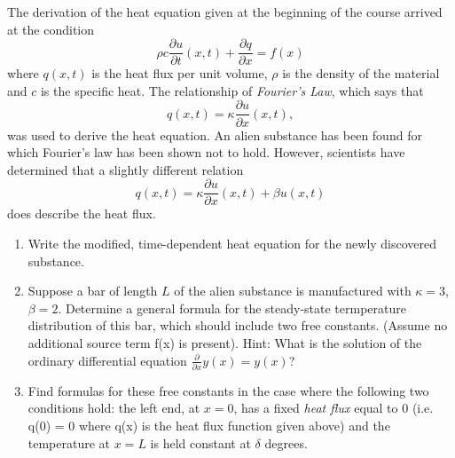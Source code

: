 
The derivation of the heat equation given at the beginning of the course arrived at the condition 
\[
\rho c \frac{\partial u}{\partial t} (x,t) + \frac{\partial q}{\partial x} = f(x)
\]
where $q(x,t)$ is the heat flux per unit volume, $\rho$ is the density of the material and $c$ is the specific heat.  The relationship of \textit{Fourier's Law}, which says that 
\[
q(x,t) = \kappa \frac{\partial u}{\partial x}(x,t),
\]
was used to derive the heat equation.  An alien substance has been found for which Fourier's law has been shown not to hold.  However, scientists have determined that a slightly different relation
\[
q(x,t) = \kappa\frac{\partial u}{\partial x}(x,t) + \beta u(x,t)
\]
does describe the heat flux.

\begin{enumerate}
\item Write the modified, time-dependent heat equation for the newly discovered substance.  

\item Suppose a bar of length $L$ of the alien substance is manufactured with $\kappa = 3$, $\beta = 2$.  Determine a general formula for the steady-state termperature distribution of this bar, which should include two free constants.  (Assume no additional source term f(x) is present). Hint: What is the solution of the ordinary differential equation $\frac{\partial}{\partial x}y(x) = y(x)$? 

\item Find formulas for these free constants in the case where the following two conditions hold: the left end, at $x=0$, has a fixed \textit{heat flux} equal to $0$ (i.e. q(0) = 0 where q(x) is the heat flux function given above) and the temperature at $x=L$ is held constant at $\delta$ degrees.



\end{enumerate}